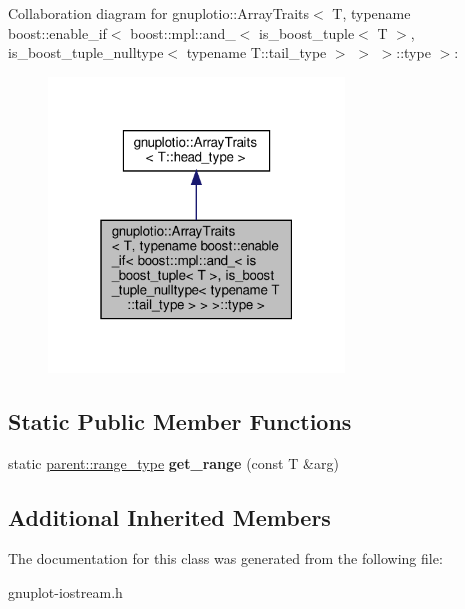 Collaboration diagram for gnuplotio\+:\+:Array\+Traits$<$ T, typename boost\+:\+:enable\+\_\+if$<$ boost\+:\+:mpl\+:\+:and\+\_\+$<$ is\+\_\+boost\+\_\+tuple$<$ T $>$, is\+\_\+boost\+\_\+tuple\+\_\+nulltype$<$ typename T\+:\+:tail\+\_\+type $>$ $>$ $>$\+:\+:type $>$\+:
\nopagebreak
\begin{figure}[H]
\begin{center}
\leavevmode
\includegraphics[width=223pt]{classgnuplotio_1_1ArrayTraits_3_01T_00_01typename_01boost_1_1enable__if_3_01boost_1_1mpl_1_1and_664a33c2200adb4ffe25ffcb83c434f5}
\end{center}
\end{figure}
\subsection*{Static Public Member Functions}
\begin{DoxyCompactItemize}
\item 
\mbox{\label{classgnuplotio_1_1ArrayTraits_3_01T_00_01typename_01boost_1_1enable__if_3_01boost_1_1mpl_1_1and_d5bfbd58f322d0a74d370034dff1881d_ad0485dd16a9d54a4eb75bf3e75b1facd}} 
static \hyperlink{structgnuplotio_1_1Error__WasNotContainer}{parent\+::range\+\_\+type} {\bfseries get\+\_\+range} (const T \&arg)
\end{DoxyCompactItemize}
\subsection*{Additional Inherited Members}


The documentation for this class was generated from the following file\+:\begin{DoxyCompactItemize}
\item 
gnuplot-\/iostream.\+h\end{DoxyCompactItemize}
